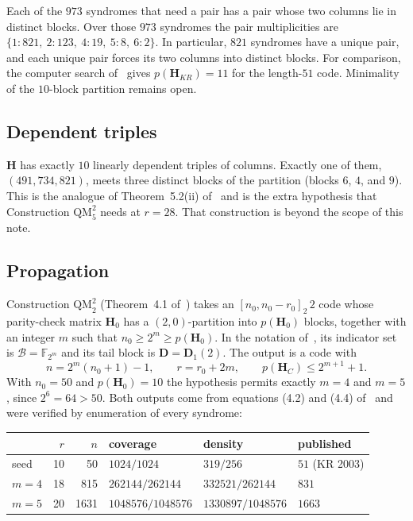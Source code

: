 \documentclass[11pt,a4paper]{article}
\newcommand{\FF}{\mathbb{F}}
\newcommand{\HH}{\boldsymbol{H}}
\begin{document}
Each of the $973$ syndromes that need a pair has a pair whose two
columns lie in distinct blocks. Over those $973$ syndromes the pair
multiplicities are $\{1{:}821,\ 2{:}123,\ 4{:}19,\ 5{:}8,\ 6{:}2\}$. In
particular, $821$ syndromes have a unique pair, and each unique pair
forces its two columns into distinct blocks. For comparison, the
computer search of~\cite{DMP2025} gives $p(\HH_{KR})=11$ for the
length-$51$ code. Minimality of the $10$-block partition remains open.

\subsection{Dependent triples}

$\HH$ has exactly $10$ linearly dependent triples of columns. Exactly
one of them, $(491,734,821)$, meets three distinct blocks of the
partition (blocks $6$, $4$, and $9$). This is the analogue of
Theorem~5.2(ii) of~\cite{DMP2025} and is the extra hypothesis that
Construction $\mathrm{QM}_5^2$ needs at $r=28$. That construction is
beyond the scope of this note.

\subsection{Propagation}
\label{sec:prop}

Construction $\mathrm{QM}_2^2$ (Theorem~4.1 of~\cite{DMP2025}) takes an
$[n_0,n_0-r_0]_2\,2$ code whose parity-check matrix $\HH_0$ has a
$(2,0)$-partition into $p(\HH_0)$ blocks, together with an integer $m$
such that $n_0\ge 2^m\ge p(\HH_0)$. In the notation of~\cite{DMP2025},
its indicator set is
$\mathscr{B}=\FF_{2^m}$ and its tail block is
$\boldsymbol{D}=\boldsymbol{D}_1(2)$. The output is a code with
\begin{equation}
\label{eq:qm}
n=2^m(n_0+1)-1,\qquad r=r_0+2m,\qquad p(\HH_C)\le 2^{m+1}+1 .
\end{equation}
With $n_0=50$ and $p(\HH_0)=10$ the hypothesis permits exactly $m=4$
and $m=5$, since $2^6=64>50$. Both outputs come from equations
(4.2) and (4.4) of~\cite{DMP2025} and were verified by enumeration of
every syndrome:

\begin{center}
\renewcommand{\arraystretch}{1.15}
\begin{tabular}{@{}lrrlll@{}}
\toprule
 & $r$ & $n$ & coverage & density & published \\
\midrule
seed & 10 & 50 & $1024/1024$ & $319/256$ & $51$ (KR 2003) \\
$m=4$ & 18 & 815 & $262144/262144$ & $332521/262144$ & $831$ \\
$m=5$ & 20 & 1631 & $1048576/1048576$ & $1330897/1048576$ & $1663$ \\
\bottomrule
\end{tabular}
\end{center}
\end{document}

